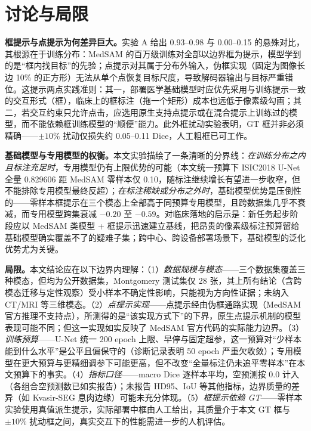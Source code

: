 \documentclass[zihao=-4,a4paper]{ctexart}
\begin{document}
\section{讨论与局限}

\textbf{框提示与点提示为何差异巨大。}实验 A 给出 0.93--0.98 与 0.00--0.15 的悬殊对比，其根源在于训练分布：MedSAM 的百万级训练对全部以边界框为提示，模型学到的是``框内找目标''的先验；点提示对其属于分布外输入，伪框实现（固定为图像长边 10\% 的正方形）无法从单个点恢复目标尺度，导致解码器输出与目标严重错位。这提示两点实践准则：其一，部署医学基础模型时应优先采用与训练提示一致的交互形式（框），临床上的框标注（拖一个矩形）成本也远低于像素级勾画；其二，若交互约束只允许点击，应选用原生支持点提示或在混合提示上训练过的模型，而不能依赖框训练模型的``顺便''能力。此外框扰动实验表明，GT 框并非必须精确——$\pm10\%$ 扰动仅损失约 0.05--0.11 Dice，人工粗框已可工作。

\textbf{基础模型与专用模型的权衡。}本文实验描绘了一条清晰的分界线：\emph{在训练分布之内且标注充足时}，专用模型仍有上限优势的可能（本文统一预算下 ISIC2018 U-Net 全量 0.829606 距 MedSAM 零样本仅 0.10，随标注继续增长有望进一步收窄，但不能排除专用模型最终反超）；\emph{在标注稀缺或分布之外时}，基础模型优势是压倒性的——零样本框提示在三个模态上全部高于同预算专用模型，且跨数据集几乎不衰减，而专用模型跨集衰减 $-0.20$ 至 $-0.59$。对临床落地的启示是：新任务起步阶段应以 MedSAM 类模型 + 框提示迅速建立基线，把昂贵的像素级标注预算留给基础模型确实覆盖不了的疑难子集；跨中心、跨设备部署场景下，基础模型的泛化优势尤为关键。

\textbf{局限。}本文结论应在以下边界内理解：（1）\emph{数据规模与模态}——三个数据集覆盖三种模态，但均为公开数据集，Montgomery 测试集仅 28 张，其上所有结论（含跨模态迁移与定性观察）受小样本不确定性影响，只能视为方向性证据；未纳入 CT/MRI 等三维模态。（2）\emph{点提示实现}——点提示经由伪框通路实现（MedSAM 官方推理不支持点），所测得的是``该实现方式下''的下界，原生点提示机制的模型表现可能不同；但这一实现如实反映了 MedSAM 官方代码的实际能力边界。（3）\emph{训练预算}——U-Net 统一 200 epoch 上限、早停与固定超参，这一预算对``少样本能到什么水平''是公平且偏保守的（诊断记录表明 50 epoch 严重欠收敛）；专用模型在更大预算与更精细调参下可能更高，但不改变``全量标注仍未追平零样本''在本文预算下的事实。（4）\emph{指标口径}——macro Dice 逐样本平均，空预测按 0.0 计入（各组合空预测数已如实报告）；未报告 HD95、IoU 等其他指标，边界质量的差异（如 Kvasir-SEG 息肉边缘）可能未充分体现。（5）\emph{框提示依赖 GT}——零样本实验使用真值派生提示，实际部署中框由人工给出，其质量介于本文 GT 框与 $\pm10\%$ 扰动框之间，真实交互下的性能需进一步的人机评估。
\end{document}
